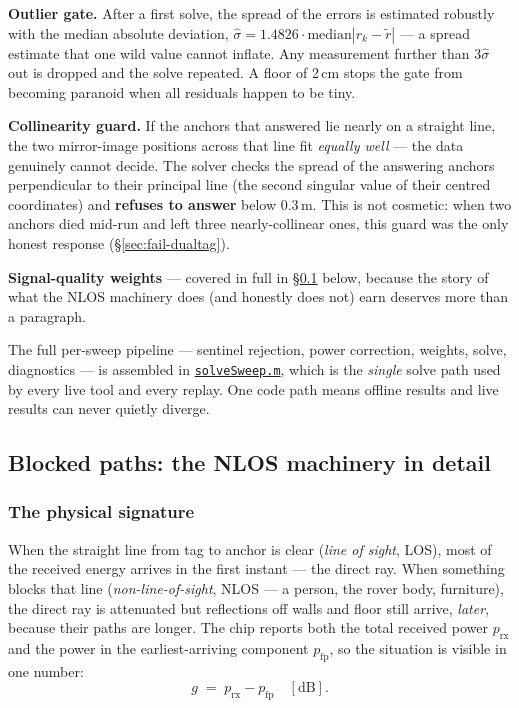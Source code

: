 \documentclass[11pt,a4paper]{article}
\newcommand{\gh}[2]{\href{https://github.com/AdershM-2/UWB_3/blob/main/#1}{\texttt{#2}}}
\begin{document}
\textbf{Outlier gate.} After a first solve, the spread of the errors is estimated
robustly with the median absolute deviation, $\hat\sigma = 1.4826\cdot
\mathrm{median}|r_k - \tilde r|$ --- a spread estimate that one wild value cannot
inflate. Any measurement further than $3\hat\sigma$ out is dropped and the solve
repeated. A floor of 2\,cm stops the gate from becoming paranoid when all
residuals happen to be tiny.

\textbf{Collinearity guard.} If the anchors that answered lie nearly on a straight
line, the two mirror-image positions across that line fit \emph{equally well} ---
the data genuinely cannot decide. The solver checks the spread of the answering
anchors perpendicular to their principal line (the second singular value of their
centred coordinates) and \textbf{refuses to answer} below 0.3\,m. This is not
cosmetic: when two anchors died mid-run and left three nearly-collinear ones, this
guard was the only honest response (\S\ref{sec:fail-dualtag}).

\textbf{Signal-quality weights} --- covered in full in \S\ref{sec:nlos} below,
because the story of what the NLOS machinery does (and honestly does not) earn
deserves more than a paragraph.

The full per-sweep pipeline --- sentinel rejection, power correction, weights,
solve, diagnostics --- is assembled in
\gh{matlab/+dune/solveSweep.m}{solveSweep.m}, which is the \emph{single} solve path
used by every live tool and every replay. One code path means offline results and
live results can never quietly diverge.

\subsection{Blocked paths: the NLOS machinery in detail}
\label{sec:nlos}

\subsubsection{The physical signature}

When the straight line from tag to anchor is clear (\emph{line of sight}, LOS),
most of the received energy arrives in the first instant --- the direct ray. When
something blocks that line (\emph{non-line-of-sight}, NLOS --- a person, the rover
body, furniture), the direct ray is attenuated but reflections off walls and floor
still arrive, \emph{later}, because their paths are longer. The chip reports both
the total received power $p_{\mathrm{rx}}$ and the power in the earliest-arriving
component $p_{\mathrm{fp}}$, so the situation is visible in one number:
\begin{equation}
g \;=\; p_{\mathrm{rx}} - p_{\mathrm{fp}} \quad [\text{dB}].
\end{equation}
\end{document}
